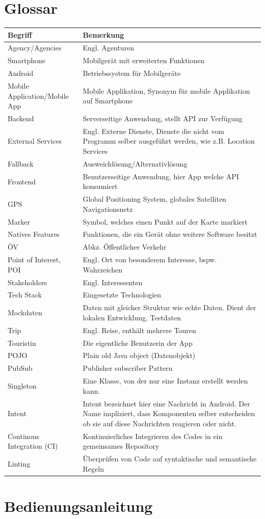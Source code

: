 \documentclass[a4paper,10pt,xetex]{article}
\begin{document}
\newpage
\section{Glossar}\label{glossar}
\begin{longtabu} to \textwidth { | l | X[l] | }
\hline
\textbf{Begriff} & \textbf{Bemerkung}\\\hline
\endhead

Agency/Agencies & Engl. Agenturen\\\hline
Smartphone & Mobilgerät mit erweiterten Funktionen\\\hline
Android & Betriebssystem für Mobilgeräte\\\hline
Mobile Application/Mobile App & Mobile Applikation, Synonym für mobile Applikation auf Smartphone\\\hline
Backend & Serverseitige Anwendung, stellt API zur Verfügung\\\hline
External Services & Engl. Externe Dienste, Dienste die nicht vom Programm selber ausgeführt werden, wie z.B. Location Services\\\hline
Fallback & Ausweichlösung/Alternativlösung\\\hline
Frontend & Benutzerseitige Anwendung, hier App welche API konsumiert\\\hline
GPS & Global Positioning System, globales Satelliten Navigationsnetz\\\hline
Marker & Symbol, welches einen Punkt auf der Karte markiert\\\hline
Natives Features & Funktionen, die ein Gerät ohne weitere Software besitzt\\\hline
ÖV & Abkz. Öffentlicher Verkehr\\\hline
Point of Interest, POI & Engl. Ort von besonderem Interesse, bspw. Wahrzeichen\\\hline
Stakeholders & Engl. Interessenten\\\hline
Tech Stack & Eingesetzte Technologien\\\hline
Mockdaten & Daten mit gleicher Struktur wie echte Daten. Dient der lokalen Entwicklung, Testdaten \\\hline
Trip & Engl. Reise, enthält mehrere Touren\\\hline
Touristin & Die eigentliche Benutzerin der App\\\hline
POJO & Plain old Java object (Datenobjekt)\\\hline
PubSub & Publisher subscriber Pattern\\\hline
Singleton & Eine Klasse, von der nur eine Instanz erstellt werden kann.\\\hline
Intent & Intent bezeichnet hier eine Nachricht in Android. Der Name impliziert, dass Komponenten
selber entscheiden ob sie auf diese Nachrichten reagieren oder nicht.\\\hline
Continous Integration (CI) & Kontinuierliches Integrieren des Codes in ein gemeinsames Repository \\\hline
Linting & Überprüfen von Code auf syntaktische und semantische Regeln \\\hline
\end{longtabu}


\section{Bedienungsanleitung}
\end{document}
